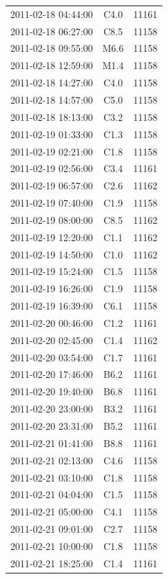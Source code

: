 \documentclass[referee,a4paper,12pt]{swsc}
\begin{document}
\begin{linenumbers}
\begin{longtable}{c|c|c}
		2011-02-18 04:44:00 & C4.0 & 11161 \\ 
		2011-02-18 06:27:00 & C8.5 & 11158 \\ 
		2011-02-18 09:55:00 & M6.6 & 11158 \\ 
		2011-02-18 12:59:00 & M1.4 & 11158 \\ 
		2011-02-18 14:27:00 & C4.0 & 11158 \\ 
		2011-02-18 14:57:00 & C5.0 & 11158 \\ 
		2011-02-18 18:13:00 & C3.2 & 11158 \\ 
		2011-02-19 01:33:00 & C1.3 & 11158 \\ 
		2011-02-19 02:21:00 & C1.8 & 11158 \\ 
		2011-02-19 02:56:00 & C3.4 & 11161 \\ 
		2011-02-19 06:57:00 & C2.6 & 11162 \\ 
		2011-02-19 07:40:00 & C1.9 & 11158 \\ 
		2011-02-19 08:00:00 & C8.5 & 11162 \\ 
		2011-02-19 12:20:00 & C1.1 & 11162 \\ 
		2011-02-19 14:50:00 & C1.0 & 11162 \\ 
		2011-02-19 15:24:00 & C1.5 & 11158 \\ 
		2011-02-19 16:26:00 & C1.9 & 11158 \\ 
		2011-02-19 16:39:00 & C6.1 & 11158 \\ 
		2011-02-20 00:46:00 & C1.2 & 11161 \\ 
		2011-02-20 02:45:00 & C1.4 & 11162 \\ 
		2011-02-20 03:54:00 & C1.7 & 11161 \\ 
		2011-02-20 17:46:00 & B6.2 & 11161 \\ 
		2011-02-20 19:40:00 & B6.8 & 11161 \\ 
		2011-02-20 23:00:00 & B3.2 & 11161 \\ 
		2011-02-20 23:31:00 & B5.2 & 11161 \\ 
		2011-02-21 01:41:00 & B8.8 & 11161 \\ 
		2011-02-21 02:13:00 & C4.6 & 11158 \\ 
		2011-02-21 03:10:00 & C1.8 & 11158 \\ 
		2011-02-21 04:04:00 & C1.5 & 11158 \\ 
		2011-02-21 05:00:00 & C4.1 & 11158 \\ 
		2011-02-21 09:01:00 & C2.7 & 11158 \\ 
		2011-02-21 10:00:00 & C1.8 & 11158 \\ 
		2011-02-21 18:25:00 & C1.4 & 11161 \\ 

\end{longtable}
\end{linenumbers}
\end{document}

